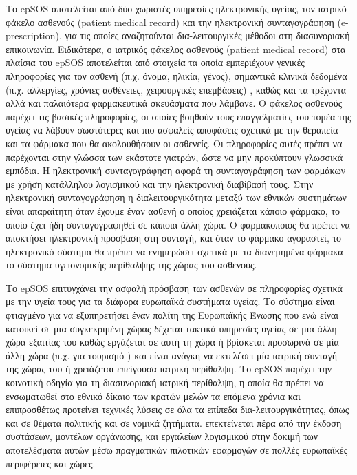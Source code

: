 		Το epSOS αποτελείται από δύο χωριστές υπηρεσίες ηλεκτρονικής υγείας, τον ιατρικό φάκελο ασθενούς (patient medical record) και την ηλεκτρονική συνταγογράφηση (e-prescription),  για τις οποίες αναζητούνται δια-λειτουργικές μέθοδοι στη διασυνοριακή επικοινωνία. Ειδικότερα, ο ιατρικός φάκελος ασθενούς  (patient medical record) στα πλαίσια του epSOS αποτελείται από στοιχεία τα οποία εμπεριέχουν γενικές πληροφορίες για τον ασθενή (π.χ. όνομα, ηλικία, γένος), σημαντικά κλινικά δεδομένα (π.χ. αλλεργίες, χρόνιες ασθένειες, χειρουργικές επεμβάσεις) , καθώς και τα τρέχοντα αλλά και παλαιότερα φαρμακευτικά σκευάσματα που λάμβανε. Ο φάκελος ασθενούς παρέχει τις βασικές πληροφορίες, οι οποίες βοηθούν τους επαγγελματίες του τομέα της υγείας να λάβουν σωστότερες και πιο ασφαλείς αποφάσεις σχετικά με την θεραπεία και τα φάρμακα που θα ακολουθήσουν οι ασθενείς. Οι πληροφορίες αυτές πρέπει να παρέχονται στην γλώσσα των εκάστοτε γιατρών, ώστε να μην προκύπτουν γλωσσικά εμπόδια. Η ηλεκτρονική συνταγογράφηση αφορά τη συνταγογράφηση των φαρμάκων με χρήση κατάλληλου λογισμικού και την ηλεκτρονική διαβίβασή τους. Στην ηλεκτρονική συνταγογράφηση η διαλειτουργικότητα μεταξύ των εθνικών συστημάτων είναι απαραίτητη όταν έχουμε έναν ασθενή ο οποίος χρειάζεται κάποιο φάρμακο, το οποίο έχει ήδη συνταγογραφηθεί σε κάποια άλλη χώρα.  Ο φαρμακοποιός θα πρέπει να αποκτήσει ηλεκτρονική πρόσβαση στη συνταγή, και όταν το φάρμακο αγοραστεί, το ηλεκτρονικό σύστημα θα πρέπει να ενημερώσει σχετικά με τα διανεμημένα φάρμακα το σύστημα υγειονομικής περίθαλψης της χώρας του ασθενούς\cite{epSOS}.
		
		 Το epSOS επιτυγχάνει την ασφαλή πρόσβαση των ασθενών σε πληροφορίες σχετικά με την υγεία τους για τα διάφορα ευρωπαϊκά συστήματα υγείας. Το σύστημα είναι φτιαγμένο για να εξυπηρετήσει έναν πολίτη της Ευρωπαϊκής Ένωσης  που ενώ είναι κατοικεί σε μια συγκεκριμένη χώρας δέχεται τακτικά υπηρεσίες υγείας σε μια άλλη χώρα εξαιτίας του καθώς εργάζεται σε αυτή τη χώρα ή βρίσκεται προσωρινά σε μία άλλη χώρα (π.χ. για τουρισμό ) και είναι ανάγκη να εκτελέσει μία ιατρική συνταγή της χώρας του ή χρειάζεται επείγουσα ιατρική περίθαλψη. Το epSOS παρέχει την κοινοτική οδηγία για τη διασυνοριακή ιατρική περίθαλψη, η οποία θα πρέπει να ενσωματωθεί στο εθνικό δίκαιο των κρατών μελών τα επόμενα χρόνια και επιπροσθέτως προτείνει τεχνικές λύσεις σε όλα τα επίπεδα δια-λειτουργικότητας, όπως και σε θέματα πολιτικής και σε νομικά ζητήματα. επεκτείνεται πέρα από την έκδοση συστάσεων, μοντέλων οργάνωσης, και εργαλείων λογισμικού  στην  δοκιμή των αποτελέσματα αυτών μέσω πραγματικών πιλοτικών εφαρμογών σε πολλές ευρωπαϊκές περιφέρειες και χώρες.
		 


